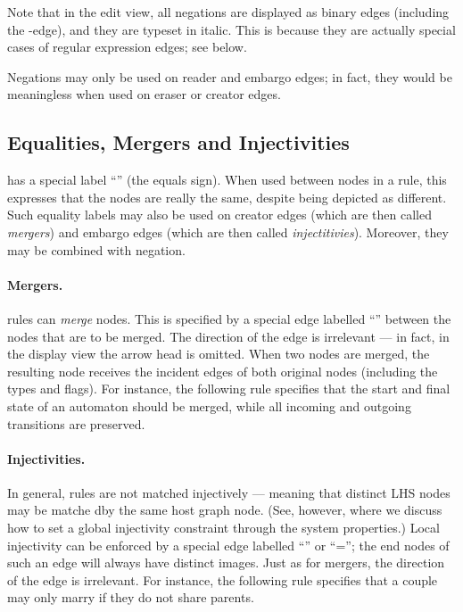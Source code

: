 Note that in the edit view, all negations are displayed as binary edges
(including the -edge), and they are typeset in italic. This
is because they are actually special cases of regular expression edges; see
 below.


Negations may only be used on reader and embargo edges; in fact, they would be
meaningless when used on eraser or creator edges.

\subsection{Equalities, Mergers and Injectivities}

\Groove{} has a special label ``\lab{=}'' (the equals sign). When used
between nodes in a rule, this expresses that the nodes are really the same,
despite being depicted as different. Such equality labels may also be used on
creator edges (which are then called \emph{mergers}) and embargo edges (which
are then called \emph{injectitivies}). Moreover, they may be combined with
negation.

\paragraph{Mergers.}

\Groove{} rules can \emph{merge} nodes. This is specified by a special edge
labelled ``\newP\lab{=}'' between the nodes that are to be merged. The
direction of the edge is irrelevant --- in fact, in the display view the arrow
head is omitted. When two nodes are merged, the resulting
node receives the incident edges of both original nodes (including the
types and flags). For instance, the following rule specifies that the start
and final state of an automaton should be merged, while all incoming and
outgoing transitions are preserved.


\paragraph{Injectivities.}

In general, rules are not matched injectively --- meaning that distinct LHS
nodes may be matche dby the same host graph node. (See, however,
 where we discuss how to set a global injectivity
constraint through the system properties.) Local injectivity can be enforced by
a special edge labelled ``\lab{!=}'' or ``\notP\lab=''; the end nodes of
such an edge will always have distinct images. Just as for mergers, the
direction of the edge is irrelevant. For instance, the following rule specifies
that a couple may only marry if they do not share parents.

